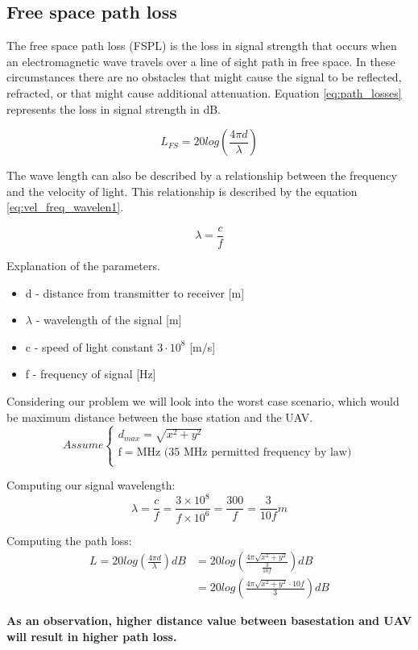 
\subsection*{Free space path loss}\label{subsection:path_loss}

The free space path loss (FSPL) is the loss in signal strength that occurs when an electromagnetic wave travels over a line of sight path in free space. In these circumstances there are no obstacles that might cause the signal to be reflected, refracted, or that might cause additional attenuation. Equation \ref{eq:path_losses} represents the loss in signal strength in dB.

\begin{equation}\label{eq:path_losses}
L_{FS} = 20log\left (\frac{4\pi d}{\lambda} \right)
\end{equation}

The wave length can also be described by a relationship between the frequency and the velocity of light. This relationship is described by the equation \ref{eq:vel_freq_wavelen1}.

\begin{equation}\label{eq:vel_freq_wavelen1}
\lambda = \frac{c}{f}
\end{equation}


Explanation of the parameters.
\begin{itemize}
\item d - distance from transmitter to receiver [m]
\item $\lambda$ - wavelength of the signal [m]
\item c - speed of light constant $3\cdot 10^8$ [m/s] 
\item f - frequency of signal [Hz]
\end{itemize}

Considering our problem we will look into the worst case scenario, which would be maximum distance between the base station and the UAV. 
\begin{equation*}
Assume \begin{cases}
d_{max} = \sqrt{x^2+y^2}\\
\text{f} = \text{MHz (35 MHz permitted frequency by law})\\
\end{cases}
\end{equation*}

Computing our signal wavelength:
\begin{equation}\label{eq:vel_freq_wavelen2}
\lambda = \frac{c}{f} = \frac{3\times 10^{8}}{f\times 10^{6}}=\frac{300}{f}=\frac{3}{10f}m
\end{equation}

Computing the path loss:
\begin{align*}\label{eq:path_loses_calc}
L = 20log\left (\frac{4\pi d}{\lambda} \right) dB &= 20log\left (\frac{4\pi \sqrt{x^2+y^2}}{\frac{3}{10f}} \right) dB \\ 
&= 20log\left (\frac{4\pi \sqrt{x^2+y^2}\cdot 10f}{ 3} \right) dB
\end{align*}

\noindent \textbf{As an observation, higher distance value between basestation and UAV will result in higher path loss.}